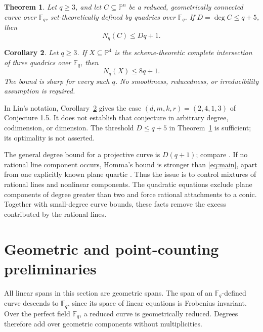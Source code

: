 \documentclass[11pt]{article}
\newtheorem{theorem}{Theorem}[section]
\newtheorem{corollary}[theorem]{Corollary}
\theoremstyle{remark}\newtheorem{remark}[theorem]{Remark}
\newcommand{\F}{\mathbb F}
\newcommand{\PP}{\mathbb P}
\newcommand{\Nq}{N_q}
\begin{document}
\begin{theorem}\label{thm:main}
Let $q\ge3$, and let $C\subseteq\PP^n$ be a reduced, geometrically connected curve over $\F_q$, set-theoretically defined by quadrics over $\F_q$. If $D=\deg C\le q+5$, then
\begin{equation}\label{eq:main}
 \Nq(C)\le Dq+1.
\end{equation}
\end{theorem}

\begin{corollary}\label{cor:ci}
Let $q\ge3$. If $X\subseteq\PP^4$ is the scheme-theoretic complete intersection of three quadrics over $\F_q$, then
\begin{equation}\label{eq:ci}
 \Nq(X)\le8q+1.
\end{equation}
The bound is sharp for every such $q$. No smoothness, reducedness, or irreducibility assumption is required.
\end{corollary}

In Lin's notation, Corollary~\ref{cor:ci} gives the case $(d,m,k,r)=(2,4,1,3)$ of Conjecture 1.5. It does not establish that conjecture in arbitrary degree, codimension, or dimension. The threshold $D\le q+5$ in Theorem~\ref{thm:main} is sufficient; its optimality is not asserted.

The general degree bound for a projective curve is $D(q+1)$; compare \cite{Couvreur}. If no rational line component occurs, Homma's bound is stronger than \eqref{eq:main}, apart from one explicitly known plane quartic \cite{Homma}. Thus the issue is to control mixtures of rational lines and nonlinear components. The quadratic equations exclude plane components of degree greater than two and force rational attachments to a conic. Together with small-degree curve bounds, these facts remove the excess contributed by the rational lines.

\section{Geometric and point-counting preliminaries}
All linear spans in this section are geometric spans. The span of an $\F_q$-defined curve descends to $\F_q$, since its space of linear equations is Frobenius invariant. Over the perfect field $\F_q$, a reduced curve is geometrically reduced. Degrees therefore add over geometric components without multiplicities.
\end{document}
